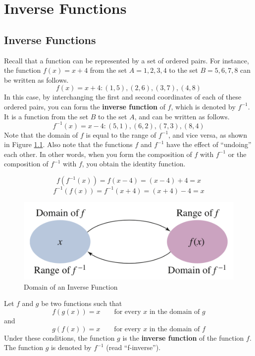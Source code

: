 \chapter{Inverse Functions}
\section{Inverse Functions}
Recall that a function can be represented by a set of ordered pairs. For instance, the function $f(x)=x+4$ from the set $A ={1, 2, 3, 4}$ to the set $B = {5, 6, 7, 8}$ can be written as follows. \cite{ci}
$$f(x) = x+4: {(1,5),(2,6),(3,7),(4,8)}$$
In this case, by interchanging the first and second coordinates of each of these ordered pairs, you can form the \textbf{inverse function} of $f$, which is denoted by $f^{-1}$. It is a function from the set $B$ to the set $A$, and can be written as follows. \cite{ci}
$$f^{-1}(x) = x-4: {(5,1),(6,2),(7,3),(8,4)}$$
Note that the domain of $f$ is equal to the range of $f^{-1}$, and vice versa, as shown in Figure \ref{fig:domain_inv}. Also note that the functions $f$ and $f^{-1}$ have the effect of “undoing” each other. In other words, when you form the composition of $f$ with $f^{-1}$ or the composition of $f^{-1}$ with $f$, you obtain the identity function. \cite{ci}

$$f(f^{-1}(x))=f(x-4)=(x-4)+4=x$$
$$f^{-1}(f(x))=f^{-1}(x+4)=(x+4)-4=x$$

\begin{figure}[H]
    \centering
    \includegraphics[scale=0.5]{img/fig/domain_inv.png}
    \caption{Domain of an Inverse Function \cite{ci}}
    \label{fig:domain_inv}
\end{figure}

\begin{definition}
    Let $f$ and $g$ be two functions such that
    $$f(g(x))=x\qquad \text{for every $x$ in the domain of $g$}$$
    and
    $$g(f(x))=x\qquad \text{for every $x$ in the domain of $f$}$$
    Under these conditions, the function $g$ is the \textbf{inverse function} of the function $f$. The function $g$ is denoted by $f^{-1}$ (read “f-inverse”). 
    \\\cite{ci}
\end{definition}

